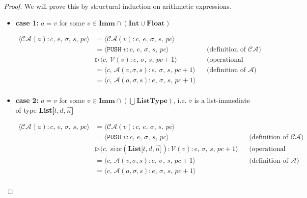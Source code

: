 \documentclass{article}
\begin{document}
\begin{proof}
We will prove this by structural induction on arithmetic expressions.

\begin{itemize}
    \item \textbf{case 1: } $a = v$ for some $v \in \textbf{Imm} \cap (\textbf{Int} \cup \textbf{Float})$

    \[
      \begin{aligned}
        \langle  \mathcal{CA}(a) : c,\, e,\, \sigma,\, s,\, pc \rangle 
        &= \langle \mathcal{CA}(v) : c,\, e,\, \sigma,\, s,\, pc \rangle \\
        &= \langle \texttt{PUSH}\;v   : c,\, e,\, \sigma,\, s,\, pc \rangle 
        && \text{(definition of $\mathcal{CA}$)} \\
        &\triangleright \langle c,\, \mathcal{V}(v) : e,\, \sigma,\, s,\, pc+1 \rangle 
        && \text{(operational semantics)} \\
        &= \langle c,\, \mathcal{A}(v, \sigma, s) : e,\, \sigma,\, s,\, pc+1 \rangle 
        && \text{(definition of $\mathcal{A}$)} \\
        &= \langle c,\, \mathcal{A}(a, \sigma, s) : e,\, \sigma,\, s,\, pc+1 \rangle \\
      \end{aligned}
  \]

  \item \textbf{case 2: } $a = v$ for some $v \in \textbf{Imm} \cap (\bigcup \textbf{ListType})$, i.e. $v$ is a list-immediate of type \textbf{List[$t, d, \vec{n}$]}

    \[
      \begin{aligned}
        \langle  \mathcal{CA}(a) : c,\, e,\, \sigma,\, s,\, pc \rangle 
        &= \langle \mathcal{CA}(v) : c,\, e,\, \sigma,\, s,\, pc \rangle \\
        &= \langle \texttt{PUSH}\;v   : c,\, e,\, \sigma,\, s,\, pc \rangle 
        && \text{(definition of $\mathcal{CA}$)} \\
        &\triangleright \langle c,\, size(\textbf{List[$t, d, \vec{n}$]}) : \mathcal{V}(v) : e,\, \sigma,\, s,\, pc+1 \rangle 
        && \text{(operational semantics)} \\
        &= \langle c,\, \mathcal{A}(v, \sigma, s) : e,\, \sigma,\, s,\, pc+1 \rangle 
        && \text{(definition of $\mathcal{A}$)} \\
        &= \langle c,\, \mathcal{A}(a, \sigma, s) : e,\, \sigma,\, s,\, pc+1 \rangle \\
      \end{aligned}
  \]


\end{itemize}
\end{proof}
\end{document}

